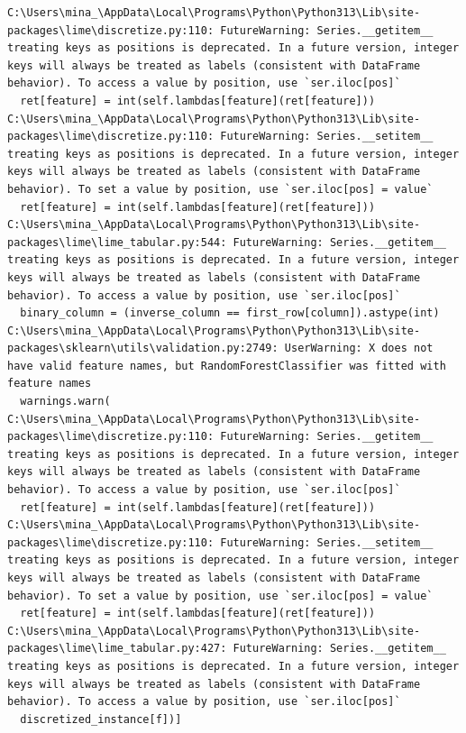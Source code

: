 \documentclass{article}
\begin{document}
{{{{{{\begin{latin}
\begin{verbatim}
C:\Users\mina_\AppData\Local\Programs\Python\Python313\Lib\site-packages\lime\discretize.py:110: FutureWarning: Series.__getitem__ treating keys as positions is deprecated. In a future version, integer keys will always be treated as labels (consistent with DataFrame behavior). To access a value by position, use `ser.iloc[pos]`
  ret[feature] = int(self.lambdas[feature](ret[feature]))
C:\Users\mina_\AppData\Local\Programs\Python\Python313\Lib\site-packages\lime\discretize.py:110: FutureWarning: Series.__setitem__ treating keys as positions is deprecated. In a future version, integer keys will always be treated as labels (consistent with DataFrame behavior). To set a value by position, use `ser.iloc[pos] = value`
  ret[feature] = int(self.lambdas[feature](ret[feature]))
C:\Users\mina_\AppData\Local\Programs\Python\Python313\Lib\site-packages\lime\lime_tabular.py:544: FutureWarning: Series.__getitem__ treating keys as positions is deprecated. In a future version, integer keys will always be treated as labels (consistent with DataFrame behavior). To access a value by position, use `ser.iloc[pos]`
  binary_column = (inverse_column == first_row[column]).astype(int)
C:\Users\mina_\AppData\Local\Programs\Python\Python313\Lib\site-packages\sklearn\utils\validation.py:2749: UserWarning: X does not have valid feature names, but RandomForestClassifier was fitted with feature names
  warnings.warn(
C:\Users\mina_\AppData\Local\Programs\Python\Python313\Lib\site-packages\lime\discretize.py:110: FutureWarning: Series.__getitem__ treating keys as positions is deprecated. In a future version, integer keys will always be treated as labels (consistent with DataFrame behavior). To access a value by position, use `ser.iloc[pos]`
  ret[feature] = int(self.lambdas[feature](ret[feature]))
C:\Users\mina_\AppData\Local\Programs\Python\Python313\Lib\site-packages\lime\discretize.py:110: FutureWarning: Series.__setitem__ treating keys as positions is deprecated. In a future version, integer keys will always be treated as labels (consistent with DataFrame behavior). To set a value by position, use `ser.iloc[pos] = value`
  ret[feature] = int(self.lambdas[feature](ret[feature]))
C:\Users\mina_\AppData\Local\Programs\Python\Python313\Lib\site-packages\lime\lime_tabular.py:427: FutureWarning: Series.__getitem__ treating keys as positions is deprecated. In a future version, integer keys will always be treated as labels (consistent with DataFrame behavior). To access a value by position, use `ser.iloc[pos]`
  discretized_instance[f])]


\end{verbatim}
\end{latin}}}}}}}
\end{document}
